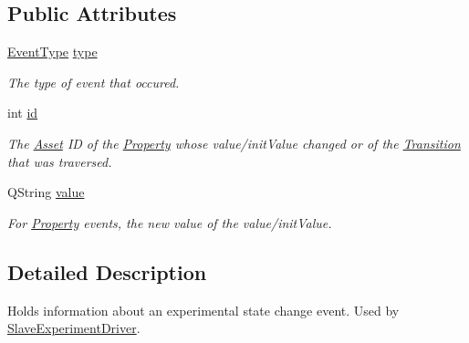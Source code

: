 \subsection*{Public Attributes}
\begin{DoxyCompactItemize}
\item 
\hypertarget{class_picto_1_1_slave_event_a29834f206ba925ab1d2061f635a5527e}{\hyperlink{class_picto_1_1_slave_event_a5e2557edef42f1cfd7ae98463166c4a4}{Event\-Type} \hyperlink{class_picto_1_1_slave_event_a29834f206ba925ab1d2061f635a5527e}{type}}\label{class_picto_1_1_slave_event_a29834f206ba925ab1d2061f635a5527e}

\begin{DoxyCompactList}\small\item\em The type of event that occured. \end{DoxyCompactList}\item 
\hypertarget{class_picto_1_1_slave_event_a434b428954206b7499ec0f78d2ee3e3c}{int \hyperlink{class_picto_1_1_slave_event_a434b428954206b7499ec0f78d2ee3e3c}{id}}\label{class_picto_1_1_slave_event_a434b428954206b7499ec0f78d2ee3e3c}

\begin{DoxyCompactList}\small\item\em The \hyperlink{class_picto_1_1_asset}{Asset} I\-D of the \hyperlink{class_picto_1_1_property}{Property} whose value/init\-Value changed or of the \hyperlink{class_picto_1_1_transition}{Transition} that was traversed. \end{DoxyCompactList}\item 
\hypertarget{class_picto_1_1_slave_event_a815af87173cf3f5bb3cf575fd7b72fd4}{Q\-String \hyperlink{class_picto_1_1_slave_event_a815af87173cf3f5bb3cf575fd7b72fd4}{value}}\label{class_picto_1_1_slave_event_a815af87173cf3f5bb3cf575fd7b72fd4}

\begin{DoxyCompactList}\small\item\em For \hyperlink{class_picto_1_1_property}{Property} events, the new value of the value/init\-Value. \end{DoxyCompactList}\end{DoxyCompactItemize}


\subsection{Detailed Description}
Holds information about an experimental state change event. Used by \hyperlink{class_picto_1_1_slave_experiment_driver}{Slave\-Experiment\-Driver}. 

